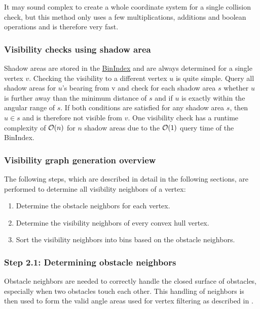 			It may sound complex to create a whole coordinate system for a single collision check, but this method only uses a few multiplications, additions and boolean operations and is therefore very fast.
			
		\subsubsection{Visibility checks using shadow area}
			
			Shadow areas are stored in the \hyperref[subsec:binindex]{BinIndex} and are always determined for a single vertex $v$.
			Checking the visibility to a different vertex $u$ is quite simple.
			Query all shadow areas for $u$'s bearing from v and check for each shadow area $s$ whether $u$ is further away than the minimum distance of $s$ and if $u$ is exactly within the angular range of $s$.
			If both conditions are satisfied for any shadow area $s$, then $u \in s$ and is therefore not visible from $v$.
			One visibility check has a runtime complexity of $\mathcal{O}(n)$ for $n$ shadow areas due to the $\mathcal{O}(1)$ query time of the BinIndex.
		
		\subsubsection{Visibility graph generation overview}
		
			The following steps, which are described in detail in the following sections, are performed to determine all visibility neighbors of a vertex:
			\begin{enumerate}[leftmargin=2.25em+\widthof{2.},label={2.\arabic*.}]
				\item Determine the obstacle neighbors for each vertex.
				\item Determine the visibility neighbors of every convex hull vertex.
				\item Sort the visibility neighbors into bins based on the obstacle neighbors.
			\end{enumerate}
		
		\subsubsection{Step 2.1: Determining obstacle neighbors}
			
			Obstacle neighbors are needed to correctly handle the closed surface of obstacles, especially when two obstacles touch each other.
			This handling of neighbors is then used to form the valid angle areas used for vertex filtering as described in .
			
